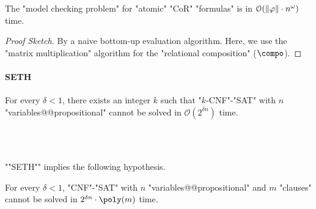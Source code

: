 \begin{proposition}\label{proposition: CoR model checking}
    The "model checking problem" for "atomic" "CoR" "formulas" is in $\mathcal{O}(\len{\fml} \cdot n^{\omega})$ time.
\end{proposition}
\begin{proof}[Proof Sketch]
    By a naive bottom-up evaluation algorithm.
    Here, we use the "matrix multiplication" algorithm for the "relational composition" ($\compo$).
\end{proof}

\paragraph*{SETH}

\begin{conjecture}\label{conjecture: SETH}
    For every $\delta < 1$,
    there exists an integer $k$ such that
    "$k$-CNF"-"SAT" with $n$ "variables@@propositional" cannot be solved in $\mathcal{O}(2^{\delta n})$ time.%
    \begin{sideyoshiki}
    \\
    \\
    \end{sideyoshiki}
\end{conjecture}
""SETH"" implies the following hypothesis.
\begin{sideyoshiki}\label{conjecture: CNF-SAT}
    \cite[Previous Work]{cyganProblemsHardCNFSAT2016}
\end{sideyoshiki}
\begin{conjecture}
    For every $\delta < 1$,
    "CNF"-"SAT" with $n$ "variables@@propositional" and $m$ "clauses" cannot be solved in $2^{\delta n} \cdot \poly(m)$ time.
\end{conjecture}

